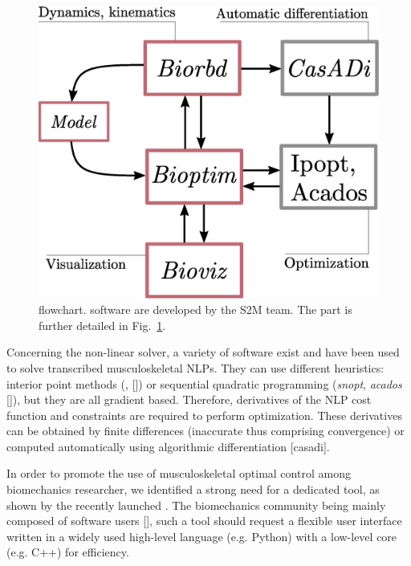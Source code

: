 \begin{figure}[t!]
\centering
\includegraphics[width=0.9\columnwidth]{figures/dependencies.eps}
\caption{\bioptim {} flowchart.  software are developed by the S2M team. The \bioptim part is further detailed in Fig.~\ref{fig:dependencies}.}
\label{fig:dependencies}
\vspace*{-0.5cm}
\end{figure}

Concerning the non-linear solver, a variety of software exist and have been used to solve transcribed musculoskeletal NLPs.
They can use different heuristics: interior point methods (\textit{}, [\addref]) or sequential quadratic programming (\textit{snopt}, \textit{acados} [\addref]), but they are all gradient based.
Therefore, derivatives of the NLP cost function and constraints are required to perform optimization.
These derivatives can be obtained by finite differences (inaccurate thus comprising convergence) or computed automatically using algorithmic differentiation [casadi].


In order to promote the use of musculoskeletal optimal control among biomechanics researcher, we identified a strong need for a dedicated tool, as shown by the recently launched . 
The biomechanics community being mainly composed of software users [\addref], such a tool should request a flexible user interface written in a widely used high-level language (e.g. Python) with a low-level core (e.g. C++) for efficiency. 

